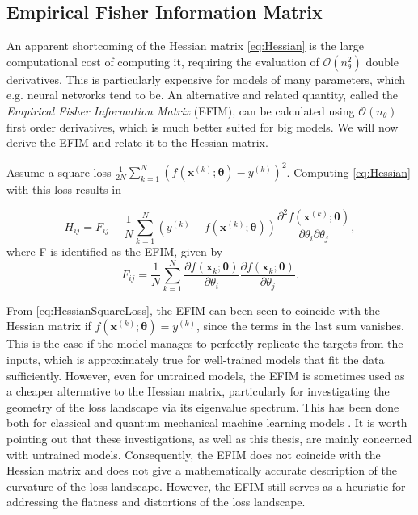 \subsection{Empirical Fisher Information Matrix}\label{sec:EFIM}
An apparent shortcoming of the Hessian matrix \cref{eq:Hessian} is the large computational cost of computing it, requiring the evaluation of $\mathcal{O}(n_\theta^2)$ double derivatives. This is particularly expensive for models of many parameters, which e.g. neural networks tend to be. An alternative and related quantity, called the \emph{Empirical Fisher Information Matrix} (EFIM)\cite{karakida2019universal}, can be calculated using $\mathcal{O}(n_\theta)$ first order derivatives, which is much better suited for big models. We will now derive the EFIM and relate it to the Hessian matrix.

Assume a square loss $\frac{1}{2N}\sum_{k=1}^{N} (f(\boldsymbol{x}^{(k)}; \boldsymbol{\theta}) - y^{(k)})^2$. Computing \cref{eq:Hessian} with this loss results in 
    
\begin{equation}\label{eq:HessianSquareLoss}
    H_{ij} = F_{ij} -
    \frac{1}{N}\sum_{k=1}^{N} (y^{(k)} - f(\boldsymbol{x}^{(k)};\boldsymbol{\theta}))\frac{\partial^2 f(\boldsymbol{x}^{(k)};\boldsymbol{\theta})}{\partial \theta_i\partial \theta_j}, 
\end{equation}
where F is identified as the EFIM, given by
\begin{equation}
\label{eq:EmpiricalFisher}
    F_{ij} =  \frac{1}{N}\sum_{k=1}^{N}
    \frac{\partial f(\boldsymbol{x}_k;\boldsymbol{\theta})}{\partial \theta_i}
    \frac{\partial f(\boldsymbol{x}_k;\boldsymbol{\theta})}{\partial \theta_j}.
\end{equation}

From \cref{eq:HessianSquareLoss}, the EFIM can been seen to coincide with the Hessian matrix if $f(\boldsymbol{x}^{(k)};\boldsymbol{\theta}) = y^{(k)}$, since the terms in the last sum vanishes. This is the case if the model manages to perfectly replicate the targets from the inputs, which is approximately true for well-trained models that fit the data sufficiently. However, even for untrained models, the EFIM is sometimes used as a cheaper alternative to the Hessian matrix, particularly for investigating the geometry of the loss landscape via its eigenvalue spectrum. This has been done both for classical and quantum mechanical machine learning models \cite{karakida2019universal} \cite{abbas2020power}. It is worth pointing out that these investigations, as well as this thesis, are mainly concerned with untrained models. Consequently, the EFIM does not coincide with the Hessian matrix and does not give a mathematically accurate description of the curvature of the loss landscape. However, the EFIM still serves as a heuristic for addressing the flatness and distortions of the loss landscape. 

